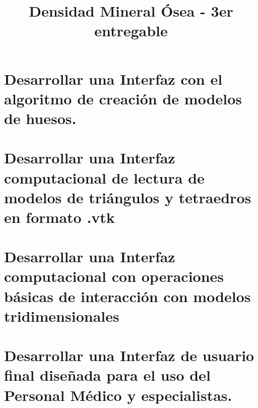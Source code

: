 \documentclass{article}
\title{Densidad Mineral Ósea - 3er entregable}
\date{}
\author{ }
\begin{document}
\maketitle

\section{Desarrollar una Interfaz con el algoritmo de creación de modelos de huesos.}

\section{Desarrollar una Interfaz computacional de lectura de modelos de triángulos y tetraedros en formato .vtk}

\section{Desarrollar una Interfaz computacional con operaciones básicas de interacción con modelos tridimensionales}

\section{Desarrollar una Interfaz de usuario final diseñada para el uso del Personal Médico y especialistas.}
\end{document}
